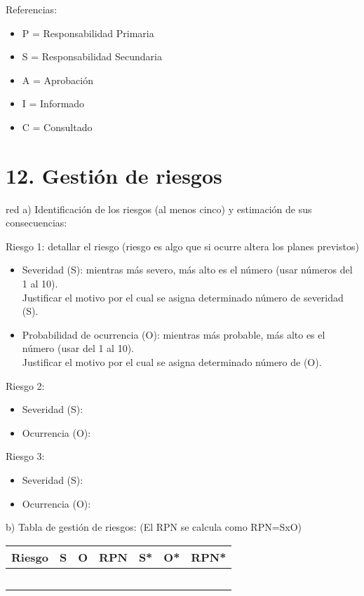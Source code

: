 \documentclass[11pt]{charter}
\begin{document}
Referencias:
\begin{itemize}
	\item P = Responsabilidad Primaria
	\item S = Responsabilidad Secundaria
	\item A = Aprobación
	\item I = Informado
	\item C = Consultado
\end{itemize}



\section{12. Gestión de riesgos}
\label{sec:riesgos}

\begin{consigna}{red}
a) Identificación de los riesgos (al menos cinco) y estimación de sus consecuencias:
 
Riesgo 1: detallar el riesgo (riesgo es algo que si ocurre altera los planes previstos)
\begin{itemize}
\item Severidad (S): mientras más severo, más alto es el número (usar números del 1 al 10).\\
Justificar el motivo por el cual se asigna determinado número de severidad (S).
\item Probabilidad de ocurrencia (O): mientras más probable, más alto es el número (usar del 1 al 10).\\
Justificar el motivo por el cual se asigna determinado número de (O). 
\end{itemize}   

Riesgo 2:
\begin{itemize}
\item Severidad (S): 
\item Ocurrencia (O):
\end{itemize}

Riesgo 3:
\begin{itemize}
\item Severidad (S): 
\item Ocurrencia (O):
\end{itemize}


b) Tabla de gestión de riesgos:      (El RPN se calcula como RPN=SxO)

\begin{table}[htpb]
\centering
\begin{tabularx}{\linewidth}{@{}|X|c|c|c|c|c|c|@{}}
\hline
\rowcolor[HTML]{C0C0C0} 
Riesgo & S & O & RPN & S* & O* & RPN* \\ \hline
       &   &   &     &    &    &      \\ \hline
       &   &   &     &    &    &      \\ \hline
       &   &   &     &    &    &      \\ \hline
       &   &   &     &    &    &      \\ \hline
       &   &   &     &    &    &      \\ \hline
\end{tabularx}%
\end{table}


\end{consigna}
\end{document}
